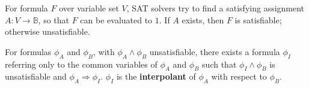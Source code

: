 \documentclass[conference]{IEEEtran}
\begin{document}


For formula $F$ over variable set $V$,
SAT solvers try to find a satisfying assignment $A:V\to \mathbb{B}$,
so that $F$ can be evaluated to $1$.
If $A$ exists, then $F$ is satisfiable;
otherwise unsatisfiable.

 




For formulas $\phi_A$ and $\phi_B$,
with $\phi_A\wedge \phi_B$ unsatisfiable,
there exists a formula $\phi_I$ referring only
to the common variables of $\phi_A$ and $\phi_B$ such that $\phi_I\wedge \phi_B$ is unsatisfiable 
and $\phi_A\Rightarrow \phi_I$.
$\phi_I$ is the \textbf{interpolant} \cite{Craig} of $\phi_A$ with respect to $\phi_B$.
\end{document}
